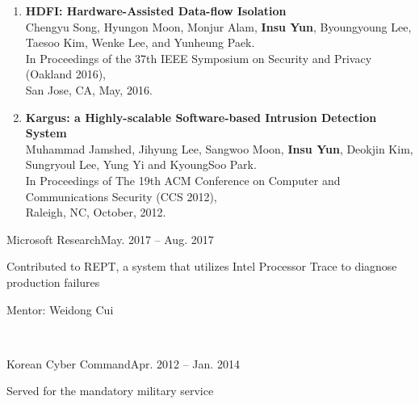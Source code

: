 \documentclass[11pt,letterpaper]{article}
\begin{document}
\begin{enumerate}
{     \textbf{* Nominated as a finalist in CSAW Best Applied Research Paper Award 2016.}
  }
  \item \textbf{HDFI: Hardware-Assisted Data-flow Isolation} \\
  {\footnotesize
    Chengyu Song, Hyungon Moon, Monjur Alam, \textbf{Insu Yun}, Byoungyoung Lee,
    Taesoo Kim, Wenke Lee, and Yunheung Paek. \\
    In Proceedings of the 37th IEEE Symposium on Security and Privacy (Oakland 2016), \\
    San Jose, CA, May, 2016.
  }
  \item \textbf{Kargus: a Highly-scalable Software-based Intrusion Detection System} \\
  {\footnotesize
    Muhammad Jamshed, Jihyung Lee, Sangwoo Moon, \textbf{Insu Yun}, Deokjin
    Kim, Sungryoul Lee, Yung Yi and KyoungSoo Park. \\
    In Proceedings of The 19th ACM Conference on Computer and Communications Security (CCS 2012), \\
    Raleigh, NC, October, 2012.
  }
\end{enumerate}

%
%

\begin{envtime}{Microsoft Research}{May. 2017 -- Aug. 2017}
\item Contributed to REPT, a system that utilizes Intel Processor Trace to diagnose production failures
  \item Mentor:  Weidong Cui
\end{envtime}
 \\
\begin{envtime}{Korean Cyber Command}{Apr. 2012 -- Jan. 2014}
  \item Served for the mandatory military service
\end{envtime}
\end{document}

